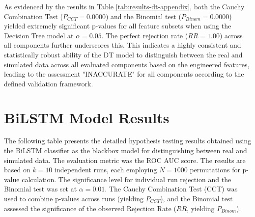 \begin{appendices}
  As evidenced by the results in Table \ref{tab:results-dt-appendix}, both the Cauchy Combination Test ($P_{CCT}=0.0000$) and the Binomial test ($P_{Binom}=0.0000$) yielded extremely significant p-values for all feature subsets when using the Decision Tree model at $\alpha=0.05$. The perfect rejection rate ($RR=1.00$) across all components further underscores this. This indicates a highly consistent and statistically robust ability of the DT model to distinguish between the real and simulated data across all evaluated components based on the engineered features, leading to the assessment "INACCURATE" for all components according to the defined validation framework.

  \section{BiLSTM Model Results}
  \label{sec:lstm_results_appendix}

  The following table presents the detailed hypothesis testing results obtained using the BiLSTM classifier as the blackbox model for distinguishing between real and simulated data. The evaluation metric was the ROC AUC score. The results are based on $k=10$ independent runs, each employing $N=1000$ permutations for p-value calculation. The significance level for individual run rejection and the Binomial test was set at $\alpha=0.01$. The Cauchy Combination Test (CCT) was used to combine p-values across runs (yielding $P_{CCT}$), and the Binomial test assessed the significance of the observed Rejection Rate ($RR$, yielding $P_{Binom}$).


\end{appendices}
